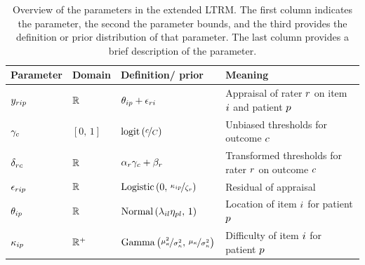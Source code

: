 \documentclass[a4paper,usenames,dvipsnames]{article}
\newenvironment{revision}{\color{teal}}{\color{black}}
\begin{document}
\begin{revision}
	
	\begin{table}[!ht]
		
		\centering
		\caption{\begin{revision}Overview of the parameters in the extended LTRM. The first column indicates the parameter, the second the parameter bounds, and the third provides the definition or prior distribution of that parameter. The last column provides a brief description of the parameter.\end{revision}}%
		
		\label{tb:ExtendedLTRMparameterOverview}
		
		\begin{tabular}{llll}
			
			\toprule
			
			Parameter & Domain & Definition/ prior & Meaning\\
			
			\midrule
			
			$y_{rip}		$&$	\mathbb{R}			$&$\theta_{ip} + \epsilon_{ri}$&
			\makecell[l]{Appraisal of rater $r$\\on item $i$ and patient $p$}\\
			
			$\gamma_c 					$&$	[0,\,1]			$&$\logit{\nicefrac{\Incat}{\Tncat}}$&
			\makecell[l]{Unbiased thresholds for\\outcome $c$}\\
			
			$\delta_{rc} 				$&$	\mathbb{R}			$&$\alpha_r \gamma_c + \beta_r$&
			\makecell[l]{Transformed thresholds\\for rater $r$ on outcome $c$}\\
			
			$\epsilon_{rip}   			$&$	\mathbb{R}			$&$\text{Logistic}\left(0,\,\nicefrac{\kappa_{ip}}{\zeta_r}\right) $&
			Residual of appraisal\\
			
			$\theta_{ip}      			$&$	\mathbb{R}			$&$\text{Normal}\left(\lambda_{il}\eta_{pl},\,1\right)$&
			\makecell[l]{Location of item $i$\\for patient $p$}\\
			
			$\kappa_{ip}   		$&$	\mathbb{R}^+	$&$\text{Gamma}\left(\nicefrac{\mu_\kappa^2}{\sigma_\kappa^2},\,\nicefrac{\mu_\kappa}{\sigma_\kappa^2}\right) $&
			\makecell[l]{Difficulty of item $i$\\ for patient $p$}\\
			

\end{tabular}
\end{table}
\end{revision}
\end{document}
